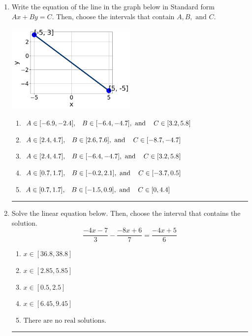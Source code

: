 \documentclass[14pt]{extbook}
\newcommand{\litem}[1]{\item#1\hspace*{-1cm}\rule{\textwidth}{0.4pt}}
\begin{document}
\begin{enumerate}
{\begin{enumerate}[label=\Alph*.]
\end{enumerate} }
\litem{
Write the equation of the line in the graph below in Standard form $Ax+By=C$. Then, choose the intervals that contain $A, B, \text{ and } C$.
\begin{center}
    \includegraphics[width=0.5\textwidth]{../Figures/linearGraphToStandardB.png}
\end{center}
\begin{enumerate}[label=\Alph*.]
\item \( A \in [-6.9, -2.4], \hspace{3mm} B \in [-6.4, -4.7], \text{ and } \hspace{3mm} C \in [3.2, 5.8] \)
\item \( A \in [2.4, 4.7], \hspace{3mm} B \in [2.6, 7.6], \text{ and } \hspace{3mm} C \in [-8.7, -4.7] \)
\item \( A \in [2.4, 4.7], \hspace{3mm} B \in [-6.4, -4.7], \text{ and } \hspace{3mm} C \in [3.2, 5.8] \)
\item \( A \in [0.7, 1.7], \hspace{3mm} B \in [-0.2, 2.1], \text{ and } \hspace{3mm} C \in [-3.7, 0.5] \)
\item \( A \in [0.7, 1.7], \hspace{3mm} B \in [-1.5, 0.9], \text{ and } \hspace{3mm} C \in [0, 4.4] \)

\end{enumerate} }
\litem{
Solve the linear equation below. Then, choose the interval that contains the solution.\[ \frac{-4x -7}{3} - \frac{-8x + 6}{7} = \frac{-4x + 5}{6} \]\begin{enumerate}[label=\Alph*.]
\item \( x \in [36.8, 38.8] \)
\item \( x \in [2.85, 5.85] \)
\item \( x \in [0.5, 2.5] \)
\item \( x \in [6.45, 9.45] \)
\item \( \text{There are no real solutions.} \)


\end{enumerate}}
\end{enumerate}
\end{document}
